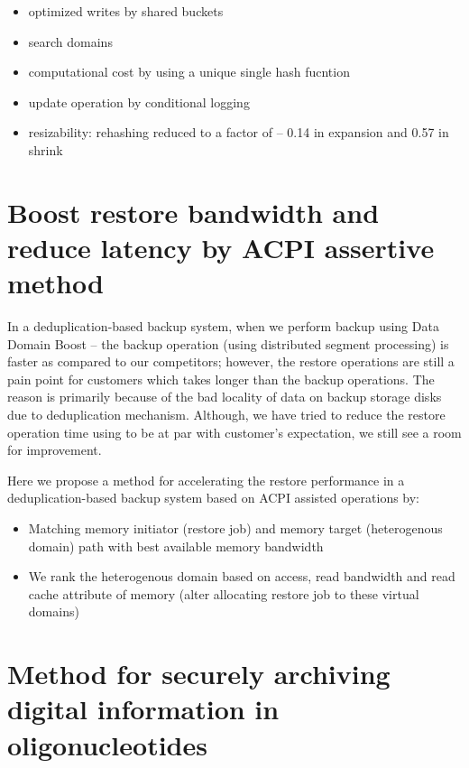 \documentclass{article}
\begin{document}
\begin{itemize} \itemsep 1pt
\item {optimized writes by shared buckets  }  
\item {search domains}  
\item {computational cost by using a unique single hash fucntion}  
\item {update operation by conditional logging}  
\item {resizability: rehashing reduced to a factor of – 0.14 in expansion and 0.57 in shrink}
\end{itemize}


\section{Boost restore bandwidth and reduce latency by ACPI assertive method}

In a deduplication-based backup system, when we perform backup using Data Domain Boost – the backup operation (using distributed segment processing) is faster as compared to our competitors; however, the restore operations are still a pain point for customers which takes longer than the backup operations. 
The reason is primarily because of the bad locality of data on backup storage disks due to deduplication mechanism. Although, we have tried to reduce the restore operation time using  to be at par with customer’s expectation, we still see a room for improvement. 

Here we propose a method for accelerating the restore performance in a deduplication-based backup system based on ACPI assisted operations by:

\begin{itemize} \itemsep 1pt
\item {Matching memory initiator (restore job) and memory target (heterogenous domain) path with best available memory bandwidth }  
\item {We rank the heterogenous domain based on access, read bandwidth and read cache attribute of memory (alter allocating restore job to these virtual domains)}  
\end{itemize}


\section{Method for securely archiving digital information in oligonucleotides}
\end{document}
